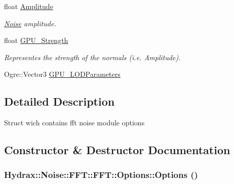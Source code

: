 \begin{CompactItemize}
float \hyperlink{struct_hydrax_1_1_noise_1_1_f_f_t_1_1_options_9e12efef04053de76ba32f2fee4e8296}{Amplitude}
\begin{CompactList}\small\item\em \hyperlink{class_hydrax_1_1_noise_1_1_noise}{Noise} amplitude. \item\end{CompactList}\item 
float \hyperlink{struct_hydrax_1_1_noise_1_1_f_f_t_1_1_options_93cca7338d3a4a201d068e4cd8afa330}{GPU\_\-Strength}
\begin{CompactList}\small\item\em Representes the strength of the normals (i.e. Amplitude). \item\end{CompactList}\item 
Ogre::Vector3 \hyperlink{struct_hydrax_1_1_noise_1_1_f_f_t_1_1_options_407abbd0ee2f841a2856f18aa69d3f98}{GPU\_\-LODParameters}
\end{CompactItemize}


\subsection{Detailed Description}
Struct wich contains fft noise module options 

\subsection{Constructor \& Destructor Documentation}
\hypertarget{struct_hydrax_1_1_noise_1_1_f_f_t_1_1_options_177f9a33f992a3ff0895688eaba0fc57}{
\subsubsection[{Options}]{\setlength{\rightskip}{0pt plus 5cm}Hydrax::Noise::FFT::FFT::Options::Options ()}}
\label{struct_hydrax_1_1_noise_1_1_f_f_t_1_1_options_177f9a33f992a3ff0895688eaba0fc57}


